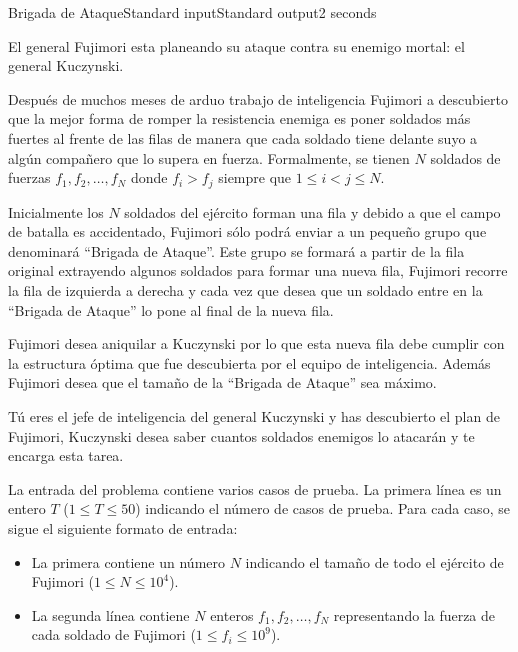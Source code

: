 \begin{problem}{Brigada de Ataque}{Standard input}{Standard output}{2 seconds}


El general Fujimori esta planeando su ataque contra su enemigo mortal: el general Kuczynski.

Después de muchos meses de arduo trabajo de inteligencia Fujimori a descubierto que la mejor forma de romper la resistencia enemiga es poner soldados más fuertes al frente de las filas de manera que cada soldado tiene delante suyo a algún compañero que lo supera en fuerza. Formalmente, se tienen $N$ soldados de fuerzas $f_1, f_2, \dots, f_N$ donde $f_i > f_j$ siempre que $1 \leq i < j \leq N$.

Inicialmente los $N$ soldados del ejército forman una fila y debido a que el campo de batalla es accidentado, Fujimori sólo podrá enviar a un pequeño grupo que denominará ``Brigada de Ataque''. Este grupo se formará a partir de la fila original extrayendo algunos soldados para formar una nueva fila, Fujimori recorre la fila de izquierda a derecha y cada vez que desea que un soldado entre en la ``Brigada de Ataque'' lo pone al final de la nueva fila.

Fujimori desea aniquilar a Kuczynski por lo que esta nueva fila debe cumplir con la estructura óptima que fue descubierta por el equipo de inteligencia. Además Fujimori desea que el tamaño de la ``Brigada de Ataque'' sea máximo.

Tú eres el jefe de inteligencia del general Kuczynski y has descubierto el plan de Fujimori, Kuczynski desea saber cuantos soldados enemigos lo atacarán y te encarga esta tarea.

\InputFile

La entrada del problema contiene varios casos de prueba. La primera línea es un entero $T$ ($1\leq T \leq 50$) indicando el número de casos de prueba. Para cada caso, se sigue el siguiente formato de entrada:

\begin{itemize}
\item La primera contiene un número $N$ indicando el tamaño de todo el ejército de Fujimori ($1 \leq N \leq 10^4$).
\item La segunda línea contiene $N$ enteros $f_1, f_2, \dots, f_N$ representando la fuerza de cada soldado de Fujimori ($1 \leq f_i \leq 10^9$).

\end{itemize}


\end{problem}
